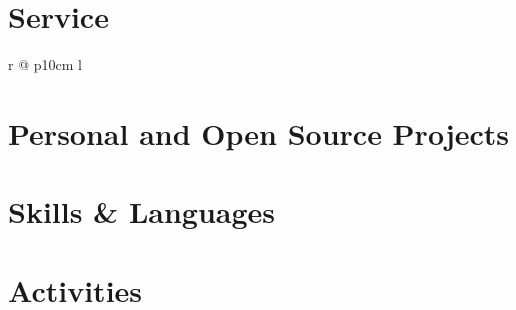 \documentclass[10pt]{article}
\begin{document}
\section{Service}
\newcommand{\service}[3]{
  \textsc{#1} & #2 \textcolor{lightg}{\dotfill} & \emph{#3}\\
}
\renewcommand*{\arraystretch}{1.33}
\begin{longtable}{r @{\hspace{0.5em}\textcolor{lightg}{}\hspace{0.5em}} p{10cm} l}
  \servicelist
\end{longtable}

\section{Personal and Open Source Projects}

\newcommand{\proj}[3]{
\begin{normalsize}
  \begin{large}\textsc{#1}\end{large} | \href{http://www.#3}{#3}
  \\
  \begin{small}\textcolor{darkg}{#2}\end{small}
\end{normalsize}

\vspace{0.5\baselineskip}}

\cockpit
\befungepy
\termdo
\matsciseg
\ratiocontour
\digitalcollation

\begin{minipage}{\linewidth}
  \section{Skills \& Languages}
  \begin{multicols}{4}
    \raggedcolumns
    \begin{itemize}
      \renewcommand{\labelitemi}{}
      \renewcommand{\skill}{\textnormal}
      \setlength{\itemsep}{1pt}
      \setlength{\parskip}{0pt}
      \setlength{\parsep}{0pt}
      \skillsListLong
    \end{itemize}
  \end{multicols}
  \skillsLegend
\end{minipage}
\vspace{-1em}

\section{Activities}
\activities

\footer

\end{document}
